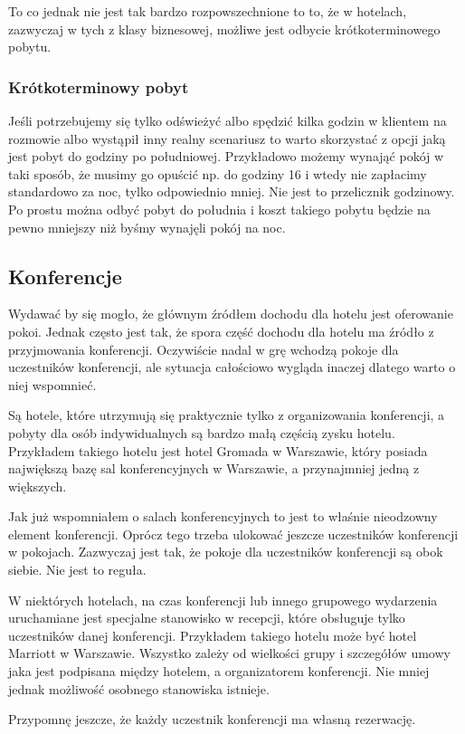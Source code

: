 \documentclass[a4paper,onecolumn,oneside,11pt,wide,floatssmall]{mwrep}
\theoremstyle{definition}
\theoremstyle{plain}%
\theoremstyle{remark}
\begin{document}
To co jednak nie jest tak bardzo rozpowszechnione to to, że w hotelach,
zazwyczaj w tych z klasy biznesowej, możliwe jest odbycie krótkoterminowego
pobytu.
\subsubsection{Krótkoterminowy pobyt}
Jeśli potrzebujemy się tylko odświeżyć albo spędzić kilka godzin w klientem na
rozmowie albo wystąpił inny realny scenariusz to warto skorzystać z opcji jaką
jest pobyt do godziny po południowej.
Przykładowo możemy wynająć pokój w taki sposób, że musimy go opuścić np. do
godziny 16 i wtedy nie zapłacimy standardowo za noc, tylko odpowiednio mniej.
Nie jest to przelicznik godzinowy. Po prostu można odbyć pobyt do południa i
koszt takiego pobytu będzie na pewno mniejszy niż byśmy wynajęli pokój na noc.

\subsection{Konferencje}
Wydawać by się mogło, że głównym źródłem dochodu dla hotelu jest oferowanie
pokoi. Jednak często jest tak, że spora część dochodu dla hotelu ma źródło z
przyjmowania konferencji. Oczywiście nadal w grę wchodzą pokoje dla uczestników
konferencji, ale sytuacja całościowo wygląda inaczej dlatego warto o niej
wspomnieć.

Są hotele, które utrzymują się praktycznie tylko z organizowania konferencji, a
pobyty dla osób indywidualnych są bardzo małą częścią zysku hotelu. Przykładem
takiego hotelu jest hotel Gromada w Warszawie, który posiada największą bazę sal
konferencyjnych w Warszawie, a przynajmniej jedną z większych.

Jak już wspomniałem o salach konferencyjnych to jest to właśnie nieodzowny
element konferencji. Oprócz tego trzeba ulokować jeszcze uczestników
konferencji w pokojach. Zazwyczaj jest tak, że pokoje dla uczestników
konferencji są obok siebie. Nie jest to reguła.

W niektórych hotelach, na czas konferencji lub innego grupowego wydarzenia
uruchamiane jest specjalne stanowisko w recepcji, które obsługuje tylko
uczestników danej konferencji. Przykładem takiego hotelu może być hotel Marriott
w Warszawie. Wszystko zależy od wielkości grupy i szczegółów umowy jaka jest
podpisana między hotelem, a organizatorem konferencji. Nie mniej jednak
możliwość osobnego stanowiska istnieje. 

Przypomnę jeszcze, że każdy uczestnik konferencji ma własną rezerwację.
\end{document}
